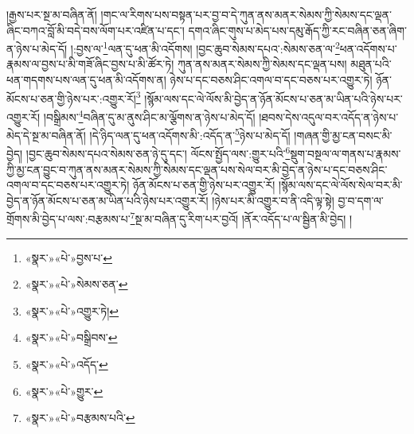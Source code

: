 །རྒྱས་པར་སྔ་མ་བཞིན་ནོ། །གང་ལ་རིགས་པས་བསྟན་པར་བྱ་བ་དེ་ཀུན་ནས་མནར་སེམས་ཀྱི་སེམས་དང་ལྡན་ཞིང་བཀའ་བློ་མི་བདེ་བས་ལོག་པར་འཛིན་པ་དང་། དགའ་ཞིང་གུས་པ་མེད་པས་དམུ་རྒོད་ཀྱི་རང་བཞིན་ཅན་ཞིག་ན་ཉེས་པ་མེད་དོ། །:བྱས་ལ་\footnote{«སྣར་»«པེ་»བྱས་པ་}ལན་དུ་ཕན་མི་འདོགས། །བྱང་ཆུབ་སེམས་དཔའ་:སེམས་ཅན་ལ་\footnote{«སྣར་»«པེ་»སེམས་ཅན་}ཕན་འདོགས་པ་རྣམས་ལ་བྱས་པ་མི་གཟོ་ཞིང་བྱས་པ་མི་ཚོར་ཏེ། ཀུན་ནས་མནར་སེམས་ཀྱི་སེམས་དང་ལྡན་པས། མཐུན་པའི་ཕན་གདགས་པས་ལན་དུ་ཕན་མི་འདོགས་ན། ཉེས་པ་དང་བཅས་ཤིང་འགལ་བ་དང་བཅས་པར་འགྱུར་ཏེ། ཉོན་མོངས་པ་ཅན་གྱི་ཉེས་པར་:འགྱུར་རོ།\footnote{«སྣར་»«པེ་»འགྱུར་ཏེ།} །སྙོམ་ལས་དང་ལེ་ལོས་མི་བྱེད་ན་ཉོན་མོངས་པ་ཅན་མ་ཡིན་པའི་ཉེས་པར་འགྱུར་རོ། །བསྒྲིམས་\footnote{«སྣར་»«པེ་»བསྒྲིབས་}བཞིན་དུ་མ་ནུས་ཤིང་མ་ལྕོགས་ན་ཉེས་པ་མེད་དོ། །ཐབས་དེས་འདུལ་བར་འདོད་ན་ཉེས་པ་མེད་དེ་སྔ་མ་བཞིན་ནོ། །དེ་ཉིད་ལན་དུ་ཕན་འདོགས་མི་:འདོད་ན་\footnote{«སྣར་»«པེ་»འདོད་}ཉེས་པ་མེད་དོ། །གཞན་གྱི་མྱ་ངན་བསང་མི་བྱེད། །བྱང་ཆུབ་སེམས་དཔའ་སེམས་ཅན་ཉེ་དུ་དང་། ལོངས་སྤྱོད་ལས་:གྱུར་པའི་\footnote{«སྣར་»«པེ་»གྱུར་}སྡུག་བསྔལ་ལ་གནས་པ་རྣམས་ཀྱི་མྱ་ངན་བྱུང་བ་ཀུན་ནས་མནར་སེམས་ཀྱི་སེམས་དང་ལྡན་པས་སེལ་བར་མི་བྱེད་ན་ཉེས་པ་དང་བཅས་ཤིང་འགལ་བ་དང་བཅས་པར་འགྱུར་ཏེ། ཉོན་མོངས་པ་ཅན་གྱི་ཉེས་པར་འགྱུར་རོ། །སྙོམ་ལས་དང་ལེ་ལོས་སེལ་བར་མི་བྱེད་ན་ཉོན་མོངས་པ་ཅན་མ་ཡིན་པའི་ཉེས་པར་འགྱུར་རོ། །ཉེས་པར་མི་འགྱུར་བ་ནི་འདི་ལྟ་སྟེ། བྱ་བ་དག་ལ་གྲོགས་མི་བྱེད་པ་ལས་:བརྩམས་པ་\footnote{«སྣར་»«པེ་»བརྩམས་པའི་}སྔ་མ་བཞིན་དུ་རིག་པར་བྱའོ། །ནོར་འདོད་པ་ལ་སྦྱིན་མི་བྱེད། །
